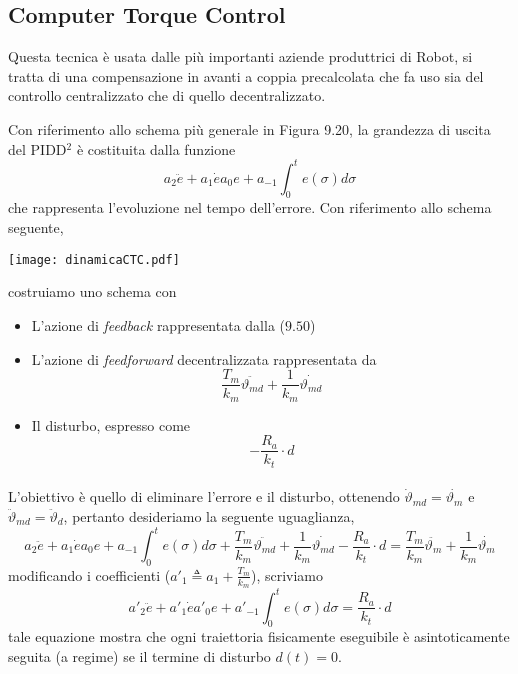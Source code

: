 \subsection{Computer Torque Control}
Questa tecnica è usata dalle più importanti aziende produttrici di Robot, si tratta di una compensazione in avanti a coppia precalcolata che fa uso sia del controllo centralizzato che di quello decentralizzato. 

Con riferimento allo schema più generale in Figura 9.20, la grandezza di uscita del PIDD$^2$ è costituita dalla funzione 
\begin{equation}
	a_2 \ddot{e} + a_1 \dot{e} a_0 e + a_{-1} \int_0^t e(\sigma) d\sigma
\end{equation}
che rappresenta l'evoluzione nel tempo dell'errore. Con riferimento allo schema seguente,
\begin{center}
	\texttt{[image: dinamicaCTC.pdf]}
\end{center}
costruiamo uno schema con
\begin{itemize}
	\item L'azione di \emph{feedback} rappresentata dalla ($9.50$)
	\item L'azione di \emph{feedforward} decentralizzata rappresentata da
		\begin{equation}
			\frac{T_m}{k_m} \ddot{\vartheta_{md}} + \frac{1}{k_m} \dot{\vartheta_{md}}
		\end{equation}
	\item Il disturbo, espresso come
		\begin{equation}
			-\frac{R_a}{k_t}\cdot d
		\end{equation}
\end{itemize}

\paragraph{}
L'obiettivo è quello di eliminare l'errore e il disturbo, ottenendo $\dot{\vartheta}_{md} = \dot{\vartheta_m}$ e $\ddot{\vartheta}_{md} = \ddot{\vartheta}_d$, pertanto desideriamo la seguente uguaglianza,
\begin{equation}
	a_2 \ddot{e} + a_1 \dot{e} a_0 e + a_{-1} \int_0^t e(\sigma) d\sigma + \frac{T_m}{k_m} \ddot{\vartheta_{md}} + \frac{1}{k_m} \dot{\vartheta_{md}} -\frac{R_a}{k_t}\cdot d = \frac{T_m}{k_m} \ddot{\vartheta_{m}} + \frac{1}{k_m} \dot{\vartheta_{m}}
\end{equation}
modificando i coefficienti ($a'_1 \triangleq a_1 + \frac{T_m}{k_m}$), scriviamo
\begin{equation}
	a'_2 \ddot{e} + a'_1 \dot{e} a'_0 e + a'_{-1} \int_0^t e(\sigma) d\sigma = \frac{R_a}{k_t} \cdot d
\end{equation}
tale equazione mostra che ogni traiettoria fisicamente eseguibile è asintoticamente seguita (a regime) se il termine di disturbo $d(t) = 0$.

